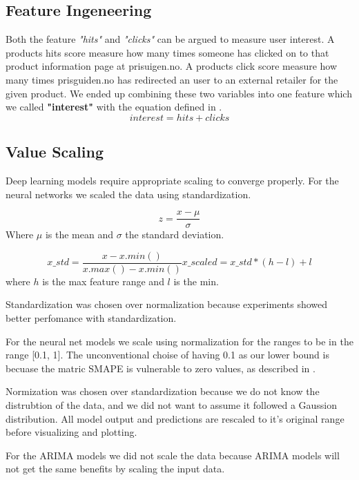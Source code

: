\subsection{Feature Ingeneering}
Both the feature \textit{"hits"} and \textit{"clicks"} can be argued to measure
user interest. A products hits score measure how many times someone has clicked
on to that product information page at prisuigen.no. A products click score measure
how many times prisguiden.no has redirected an user to an external retailer for the given product.
We ended up combining these two variables into one feature which we called \textbf{"interest"}
with the equation defined in .
\begin{equation}
  interest = hits + clicks
  \label{eq:interest}
\end{equation}

\subsection{Value Scaling}
Deep learning models require appropriate scaling to converge properly.
For the neural networks we scaled the data using standardization.

\begin{equation}
  z = \frac{x - \mu}{\sigma}
\end{equation}
Where $\mu$ is the mean and $\sigma$ the standard deviation.

\begin{equation}
  x\_std = \frac{x - x.min()}{x.max() - x.min()}
  x\_scaled = x\_std * (h - l) + l
\end{equation}
where $h$ is the max feature range and $l$ is the min.

Standardization was chosen over normalization because experiments showed better perfomance with
standardization.

For the neural net models we scale using normalization for the ranges to be in the range [0.1, 1].
The unconventional choise of having 0.1 as our lower bound is becuase the matric SMAPE
is vulnerable to zero values, as described in .

Normization was chosen over standardization because we do not know the distrubtion
of the data, and we did not want to assume it followed a Gaussion distribution.
All model output and predictions are rescaled to it's original range before
visualizing and plotting.

For the ARIMA models we did not scale the data because ARIMA models will not
get the same benefits by scaling the input data.

